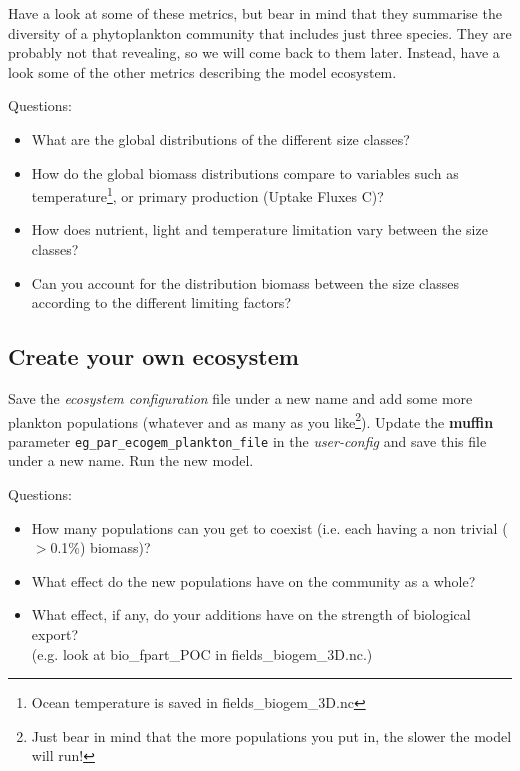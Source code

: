 \documentclass[11pt,fleqn]{book} %
\begin{document}
\pagebreak

Have a look at some of these metrics, but bear in mind that they summarise the diversity of a phytoplankton community that includes just three species. They are probably not that revealing, so we will come back to them later. Instead, have a look some of the other metrics describing the model ecosystem.

Questions:

\begin{itemize}
\vspace{1mm}
\item What are the global distributions of the different size classes?
\vspace{1mm}
\item How do the global biomass distributions compare to variables such as temperature\footnote{Ocean temperature is saved in \textsf{\scriptsize fields\_biogem\_3D.nc}}, or primary production (\textsf{\footnotesize Uptake Fluxes C})?
\vspace{1mm}
\item How does nutrient, light and temperature limitation vary between the size classes?
\vspace{1mm}
\item Can you account for the distribution biomass between the size classes according to the different limiting factors?
\end{itemize}
\vspace{2mm}


\subsection{Create your own ecosystem}

Save the \textit{ecosystem configuration} file under a new name and add some more plankton populations (whatever and as many as you like\footnote{Just bear in mind that the more populations you put in, the slower the model will run!}). Update the \textbf{muffin} parameter \texttt{eg\_par\_ecogem\_plankton\_file} in the \textit{user-config} and save this file under a new name.  Run the new model.

Questions:

\begin{itemize}
\vspace{1mm}
\item How many populations can you get to coexist (i.e. each having a non trivial ($>$0.1\%) biomass)?
\vspace{1mm}
\item What effect do the new populations have on the community as a whole?
\vspace{1mm} \item What effect, if any, do your additions have on the strength of biological export?\\(e.g. look at \textsf{\footnotesize bio\_fpart\_POC} in \textsf{\footnotesize fields\_biogem\_3D.nc}.)
\end{itemize}
\vspace{2mm}
\end{document}
